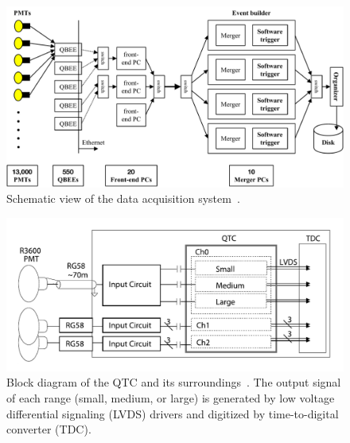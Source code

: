 \begin{figure}[tbp]
	\centering
	\includegraphics[width=15cm]{Figures/002/F18_DAQ}
	\caption[Schematic view of the data acquisition system]{\label{002_F18_DAQ} Schematic view of the data acquisition system~\cite{2010Yamada}.}
\end{figure}

\begin{figure}[tbp]
	\centering
	\includegraphics[width=15cm]{Figures/002/F16_QTC}
	\caption[Block diagram of the QTC and its surroundings]{\label{002_F16_QTC} Block diagram of the QTC and its surroundings~\cite{2009Nishino}. The output signal of each range (small, medium, or large) is generated by low voltage differential signaling (LVDS) drivers and digitized by time-to-digital converter (TDC).}
\end{figure}

